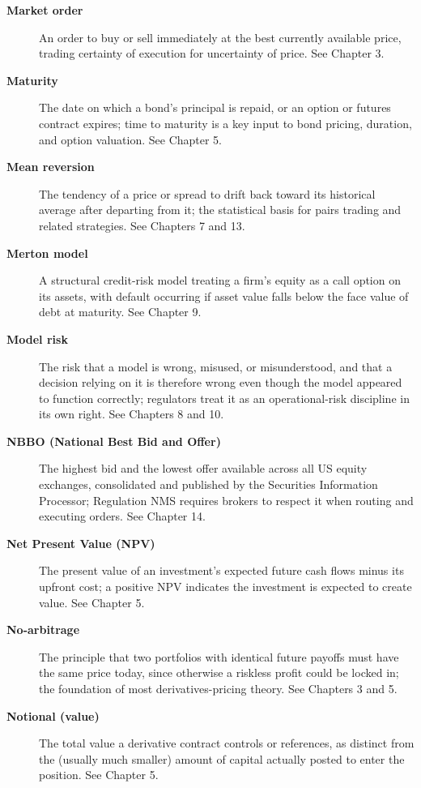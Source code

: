 \documentclass[../ai_in_finance]{subfiles}
\begin{document}
\begin{description}
\item[\textbf{Market order}] An order to buy or sell immediately at the best currently available price, trading certainty of execution for uncertainty of price. See Chapter 3.

\item[\textbf{Maturity}] The date on which a bond's principal is repaid, or an option or futures contract expires; time to maturity is a key input to bond pricing, duration, and option valuation. See Chapter 5.

\item[\textbf{Mean reversion}] The tendency of a price or spread to drift back toward its historical average after departing from it; the statistical basis for pairs trading and related strategies. See Chapters 7 and 13.

\item[\textbf{Merton model}] A structural credit-risk model treating a firm's equity as a call option on its assets, with default occurring if asset value falls below the face value of debt at maturity. See Chapter 9.


\item[\textbf{Model risk}] The risk that a model is wrong, misused, or misunderstood, and that a decision relying on it is therefore wrong even though the model appeared to function correctly; regulators treat it as an operational-risk discipline in its own right. See Chapters 8 and 10.

\item[\textbf{NBBO (National Best Bid and Offer)}] The highest bid and the lowest offer available across all US equity exchanges, consolidated and published by the Securities Information Processor; Regulation NMS requires brokers to respect it when routing and executing orders. See Chapter 14.

\item[\textbf{Net Present Value (NPV)}] The present value of an investment's expected future cash flows minus its upfront cost; a positive NPV indicates the investment is expected to create value. See Chapter 5.

\item[\textbf{No-arbitrage}] The principle that two portfolios with identical future payoffs must have the same price today, since otherwise a riskless profit could be locked in; the foundation of most derivatives-pricing theory. See Chapters 3 and 5.

\item[\textbf{Notional (value)}] The total value a derivative contract controls or references, as distinct from the (usually much smaller) amount of capital actually posted to enter the position. See Chapter 5.


\end{description}
\end{document}
